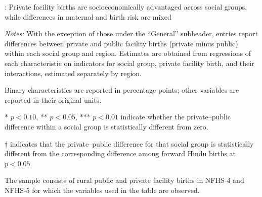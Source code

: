 \documentclass[12pt]{article}
\begin{document}
\clearpage



\begin{landscape}

\renewcommand{\arraystretch}{1.2}
\setlength{\tabcolsep}{9pt}

\begin{table}[H]
    \centering

    \caption{
        : Private facility births are socioeconomically advantaged across
        social groups, while differences in maternal and birth risk are mixed
    }
    \label{tab:private_public_characteristics}

    \vspace{0.4em}

    \begin{threeparttable}

        \begin{adjustbox}{max width=\linewidth}
            \scriptsize
            
        \end{adjustbox}

        \vspace{0.5em}

        \begin{minipage}{0.92\linewidth}
            \scriptsize
            \textit{Notes:}
            With the exception of those under the ``General'' subheader,
            entries report differences between private and public facility
            births (private minus public) within each social group and region.
            Estimates are obtained from regressions of each characteristic on
            indicators for social group, private facility birth, and their
            interactions, estimated separately by region.

            Binary characteristics are reported in percentage points; other
            variables are reported in their original units.

            * $p<0.10$, ** $p<0.05$, *** $p<0.01$ indicate whether the
            private--public difference within a social group is statistically
            different from zero.

            $\dagger$ indicates that the private--public difference for that
            social group is statistically different from the corresponding
            difference among forward Hindu births at $p<0.05$.

            The sample consists of rural public and private facility births
            in NFHS-4 and NFHS-5 for which the variables used in the table
            are observed.
        \end{minipage}

    \end{threeparttable}

\end{table}

\setlength{\tabcolsep}{6pt}
\renewcommand{\arraystretch}{1}

\end{landscape}
\end{document}
